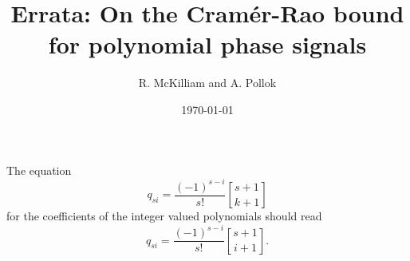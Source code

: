 \documentclass{article}
\title{Errata: On the Cram\'{e}r-Rao bound for polynomial phase signals}
\author{R. McKilliam and A. Pollok}
\date{\today}
\begin{document}
\maketitle

\newcommand{\stirling}[2]{\genfrac{[}{]}{0pt}{}{#1}{#2}}

The equation
\[
q_{si} = \frac{(-1)^{s-i}}{s!}\stirling{s+1}{k+1}
\]
for the coefficients of the integer valued polynomials should read
\[
q_{si} = \frac{(-1)^{s-i}}{s!}\stirling{s+1}{i+1}.
\] 
\end{document}

